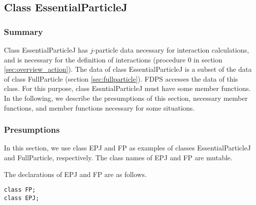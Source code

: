 \subsection{Class EssentialParticleJ}
\label{sec:example_essentialparticlej}

\subsubsection{Summary}

Class EssentialParticleJ has $j$-particle data necessary for
interaction calculations, and is necessary for the definition of
interactions (procedure 0 in section \ref{sec:overview_action}). The
data of class EssentialParticleJ is a subset of the data of class
FullParticle (section \ref{sec:fullparticle}). FDPS accesses the data
of this class. For this purpose, class EssntialParticleJ must have
some member functions. In the following, we describe the presumptions
of this section, necessary member functions, and member functions
necessary for some situations.

\subsubsection{Presumptions}

In this section, we use class EPJ and FP as examples of classes
EssentialParticleJ and FullParticle, respectively. The class names of
EPJ and FP are mutable.

The declarations of EPJ and FP are as follows.
\begin{screen}
\begin{verbatim}
class FP;
class EPJ;
\end{verbatim}
\end{screen}

